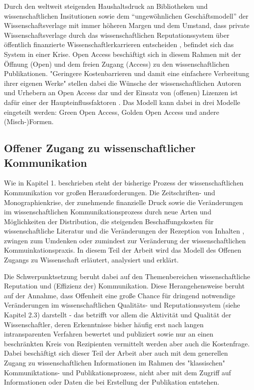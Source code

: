 Durch den weltweit steigenden Haushaltsdruck an Bibliotheken und wissenschaftlichen Insitutionen sowie dem “ungewöhnlichen Geschäftsmodell” \cite{cite:12} der Wissenschaftsverlage mit immer höheren Margen \cite{albert_2006_open_implications} und dem Umstand, dass private Wissenschaftsverlage durch das wissenschaftlichen Reputationssystem über öffentlich finanzierte Wissenschaftlerkarrieren entscheiden \cite{heise_2012}, befindet sich das System in einer Krise\cite{cite:14}. Open Access beschäftigt sich in diesem Rahmen mit der Öffnung (Open) und dem freien Zugang (Access) zu den wissenschaftlichen Publikationen. "Geringere Kostenbarrieren und damit eine einfachere Verbreitung ihrer eigenen Werke" \cite{WD_bundestag_2009} stellen dabei die Wünsche der wissenschaftlichen Autoren und Urhebern an Open Access dar und der Einsatz von (offenen) Lizenzen ist dafür einer der Haupteinflussfaktoren \cite{cite:16}. Das Modell kann dabei in drei Modelle eingeteilt werden: Green Open Access, Golden Open Access und andere (Misch-)Formen.

\subsection{Offener Zugang zu wissenschaftlicher Kommunikation}

Wie in Kapitel 1. beschrieben steht der bisherige Prozess der wissenschaftlichen Kommunikation vor großen Herausforderungen. Die Zeitschriften- und Monographienkrise, der zunehmende finanzielle Druck sowie die Veränderungen im wissenschaftlichen Kommunikationsprozess durch neue Arten und Möglichkeiten der Distribution, die steigenden Beschaffungskosten für wissenschaftliche Literatur \cite{cite:17} und die Veränderungen der Rezeption von Inhalten \cite{holub_2013_reception}, zwingen zum Umdenken oder zumindest zur Veränderung der wissenschaftlichen Kommuinkationspraxis. In diesem Teil der Arbeit wird das Modell des Offenen Zugangs zu Wissenschaft erläutert, analysiert und erklärt.

Die Schwerpunktsetzung beruht dabei auf den Themenbereichen wissenschaftliche Reputation und (Effizienz der) Kommunikation. Diese Herangehensweise beruht auf der Annahme, dass Offenheit eine große Chance für dringend notwendige Veränderungen im wissenschaftlichen Qualitäts- und Reputationssystem (siehe Kapitel 2.3) darstellt - das betrifft vor allem die Aktivität und Qualität der Wissenschaftler, deren Erkenntnisse bisher häufig erst nach langen intransparenten Verfahren bewertet und publiziert sowie nur an einen beschränkten Kreis von Rezipienten vermittelt werden aber auch die Kostenfrage. Dabei beschäftigt sich dieser Teil der Arbeit aber auch mit dem generellen Zugang zu wissenschaftlichen Informationen im Rahmen des "klassischen" Kommuniktations- und Publikationsprozess, nicht aber mit dem Zugriff auf Informationen oder Daten die bei Erstellung der Publikation entstehen. 

